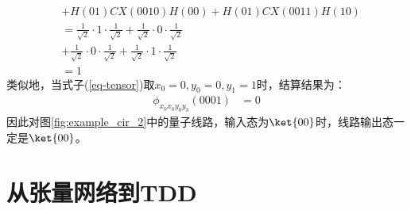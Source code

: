 \begin{example}
\begin{equation}
\begin{aligned}
        &+H\left(01\right)CX\left(0010\right)H\left(00\right)+H\left(01\right)CX\left(0011\right)H\left(10\right)\\
        &=\frac{1}{\sqrt{2}}\cdot 1 \cdot \frac{1}{\sqrt{2}}+\frac{1}{\sqrt{2}}\cdot 0 \cdot\frac{1}{\sqrt{2}}\\
        &+\frac{1}{\sqrt{2}}\cdot 0 \cdot \frac{1}{\sqrt{2}}+\frac{1}{\sqrt{2}}\cdot 1 \cdot\frac{1}{\sqrt{2}}\\
        &= 1
    \end{aligned}
    \label{eq-ex_cal_1}
\end{equation}
类似地，当式子(\ref{eq-tensor})取\(x_0 = 0, y_0 = 0, y_1 = 1\)时，结算结果为：
\begin{equation}
    \begin{aligned}
\phi_{x_0x_0y_0y_3}\left(0001\right)&=0
    \end{aligned}
\end{equation}
因此对图\ref{fig:example_cir_2}中的量子线路，输入态为\(\ket{00}\)时，线路输出态一定是\(\ket{00}\)。
\end{example}
\section{从张量网络到TDD}
